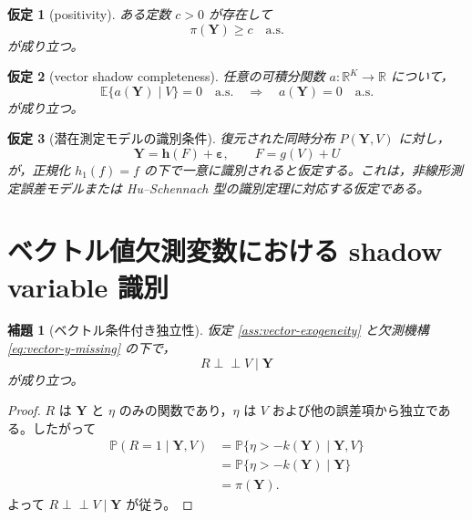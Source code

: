 \documentclass[dvipdfmx,autodetect-engine]{jsarticle}
\newtheorem{assumption}{仮定}
\newtheorem{lemma}{補題}
\newcommand{\indep}{\mathrel{\perp\!\!\!\perp}}
\newcommand{\E}{\mathbb{E}}
\newcommand{\Prb}{\mathbb{P}}
\newcommand{\R}{\mathbb{R}}
\newcommand{\1}{\mathbf{1}}
\newcommand{\Y}{\bm{Y}}
\newcommand{\eps}{\bm{\varepsilon}}
\begin{document}
\begin{assumption}[positivity]
\label{ass:vector-positivity}
ある定数 $c>0$ が存在して
\begin{equation}
  \pi(\Y)\geq c\quad \mathrm{a.s.}
  \label{eq:vector-positivity}
\end{equation}
が成り立つ。
\end{assumption}

\begin{assumption}[vector shadow completeness]
\label{ass:vector-completeness}
任意の可積分関数 $a:\R^K\to\R$ について，
\begin{equation}
  \E\{a(\Y)\mid V\}=0\quad \mathrm{a.s.}
  \quad\Longrightarrow\quad
  a(\Y)=0\quad \mathrm{a.s.}
  \label{eq:vector-completeness}
\end{equation}
が成り立つ。
\end{assumption}

\begin{assumption}[潜在測定モデルの識別条件]
\label{ass:vector-latent-identification}
復元された同時分布 $P(\Y,V)$ に対し，
\begin{equation}
  \Y=\bm h(F)+\eps,
  \qquad
  F=g(V)+U
  \label{eq:vector-latent-id}
\end{equation}
が，正規化 $h_1(f)=f$ の下で一意に識別されると仮定する。これは，非線形測定誤差モデルまたは Hu--Schennach 型の識別定理に対応する仮定である。
\end{assumption}

\section{ベクトル値欠測変数における shadow variable 識別}

\begin{lemma}[ベクトル条件付き独立性]
\label{lem:vector-shadow-independence}
仮定 \ref{ass:vector-exogeneity} と欠測機構 \eqref{eq:vector-y-missing} の下で，
\begin{equation}
  R\indep V\mid \Y
  \label{eq:vector-shadow-independence}
\end{equation}
が成り立つ。
\end{lemma}

\begin{proof}
$R$ は $\Y$ と $\eta$ のみの関数であり，$\eta$ は $V$ および他の誤差項から独立である。したがって
\begin{align}
  \Prb(R=1\mid \Y,V)
  &=\Prb\{\eta>-k(\Y)\mid \Y,V\}\\
  &=\Prb\{\eta>-k(\Y)\mid \Y\}\\
  &=\pi(\Y).
\end{align}
よって $R\indep V\mid \Y$ が従う。
\end{proof}
\end{document}
